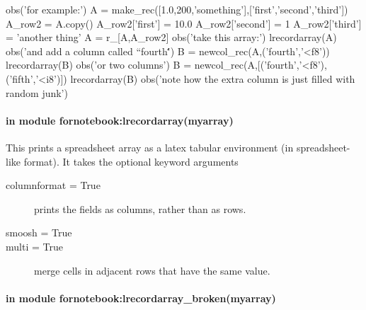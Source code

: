 \begin{python}
obs('for example:')
A = make_rec([1.0,200,'something'],['first','second','third'])
A_row2 = A.copy()
A_row2['first'] = 10.0
A_row2['second'] = 1
A_row2['third'] = 'another thing'
A = r_[A,A_row2]
obs('take this array:')
lrecordarray(A)
obs('and add a column called ``fourth\'\'')
B = newcol_rec(A,('fourth','<f8'))
lrecordarray(B)
obs('or two columns')
B = newcol_rec(A,[('fourth','<f8'),('fifth','<i8')])
lrecordarray(B)
obs('note how the extra column is just filled with random junk')
\end{python}

\paragraph{{\scriptsize in module fornotebook:}lrecordarray(myarray)}
This prints a spreadsheet array
    as a latex tabular environment (in spreadsheet-like format).
It takes the optional keyword arguments
\begin{mykwargs}
    \begin{description}
        \item[columnformat = True] prints the fields as columns, rather than as rows.
        \item[smoosh = True] 
        \item[multi = True] merge cells in adjacent rows that have the same value.
    \end{description}
\end{mykwargs}
\paragraph{{\scriptsize in module fornotebook:}lrecordarray\_broken(myarray)}
